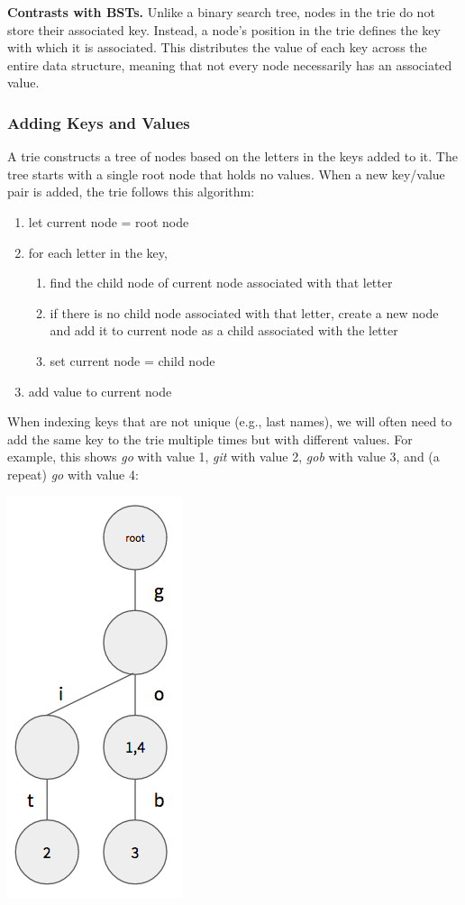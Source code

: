 \documentclass[12pt]{article}
\begin{document}
	\textbf{Contrasts with BSTs.} Unlike a binary search tree, nodes in the trie do not store their associated key. Instead, a node's position in the trie defines the key with which it is associated. This distributes the value of each key across the entire data structure, meaning that not every node necessarily has an associated value.
	
	\subsubsection*{Adding Keys and Values}
	A trie constructs a tree of nodes based on the letters in the keys added to it. The tree starts with a single root node that holds no values. When a new key/value pair is added, the trie follows this algorithm:
	\begin{enumerate}[itemsep=0mm]
		\item let current node = root node
		\item for each letter in the key,
		\begin{enumerate}
			\item find the child node of current node associated with that letter
			\item if there is no child node associated with that letter, create a new node and add it to current node as a child associated with the letter
			\item set current node = child node
		\end{enumerate}
		\item add value to current node
	\end{enumerate}
	
	When indexing keys that are not unique (e.g., last names), we will often need to add the same key to the trie multiple times but with different values. For example, this shows \emph{go} with value 1, \emph{git} with value 2, \emph{gob} with value 3, and (a repeat) \emph{go} with value 4:
	
	\begin{center}
		\includegraphics[scale=0.5]{img/trie4.png}
	\end{center}
\end{document}
